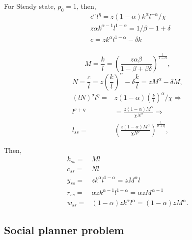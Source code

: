 \documentclass[]{article}
\begin{document}
For Steady state, \(p_0=1\), then, \begin{equation}\label{ssfoc}
            \begin{split}
                &c^{\sigma} l^{\eta}=
                z(1-\alpha)k^{\alpha}l^{-\alpha}/\chi\\
                &z\alpha k^{\alpha -1}l^{1-\alpha}=
                1/\beta -1 +\delta\\
                &c=zk^{\alpha}l^{1-\alpha}-\delta k
            \end{split}
            \end{equation}\\
\begin{equation*}
                M=\frac{k}{l}=\left(\frac{z\alpha \beta}{1-\beta +\beta \delta}\right)^{\frac{1}{1-\alpha}},
            \end{equation*} \begin{equation*}
                N=\frac{c}{l}=z(\frac{k}{l})^{\alpha}-\delta \frac{k}{l}=zM^{\alpha}-\delta M,
            \end{equation*} \begin{equation*}
            \begin{split}
                (lN)^{\sigma}l^{\eta}=&
                z(1-\alpha)(\frac{k}{l})^{\alpha}/\chi\Rightarrow\\
                l^{\sigma+\eta}&=\frac{z(1-\alpha)M^{\alpha}}{\chi N^{\sigma}} \Rightarrow\\
                l_{ss}=&\left(\frac{z(1-\alpha)M^{\alpha}}{\chi N^{\sigma}}\right)^{\frac{1}{\sigma+\eta}},
            \end{split}
            \end{equation*}

Then, \begin{equation*}
            \begin{split}
                k_{ss}=&Ml\\
                c_{ss}=&Nl\\
                y_{ss}=&zk^{\alpha}l^{1-\alpha}=zM^{\alpha}l\\
                r_{ss}=&\alpha zk^{\alpha-1}l^{1-\alpha}=\alpha zM^{\alpha -1}\\
                w_{ss}=&(1-\alpha)zk^{\alpha}l^{\alpha}=(1-\alpha)zM^{\alpha}.
            \end{split}
            \end{equation*}

\hypertarget{social-planner-problem}{%
\subsection{Social planner problem}\label{social-planner-problem}}
\end{document}
